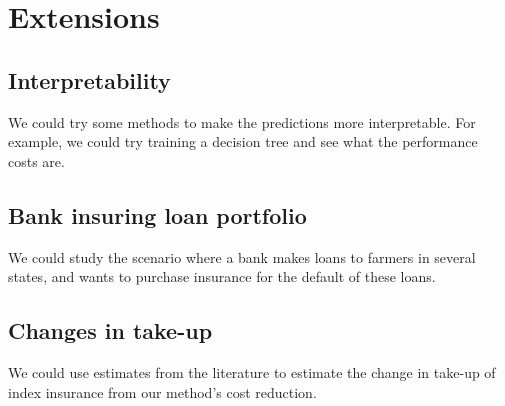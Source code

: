 \documentclass[11pt]{article}
\begin{document}
\section{Extensions}
  \subsection{Interpretability}
    We could try some methods to make the predictions more interpretable. For example, we could try training a decision tree and see what the performance costs are. 
  \subsection{Bank insuring loan portfolio}
    We could study the scenario where a bank makes loans to farmers in several states, and wants to purchase insurance for the default of these loans. 
  \subsection{Changes in take-up}
    We could use estimates from the literature to estimate the change in take-up of index insurance from our method's cost reduction. 
\end{document}
